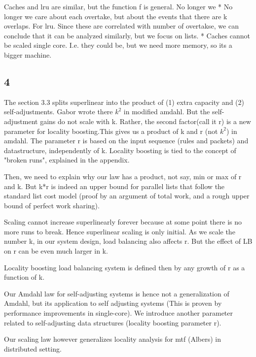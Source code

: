 Caches and lru are similar, but the function f is general. No longer we
* No longer we care about each overtake, but about the events that there are k overlaps. For lru. Since these are correlated with number of overtakse, we can conclude that it can be analyzed similarly, but we focus on lists.
* Caches cannot be scaled single core. I.e. they could be, but we need more memory, so its a bigger machine.

\subsection{4}



The section 3.3 splits superlinear into the product  of (1) extra  capacity and (2) self-adjustments. Gabor wrote there $k^2$ in modified amdahl. But the self-adjustment gains do not scale with k. Rather, the second factor(call it r) is a new parameter for locality boosting.This gives us a product of k and r (not $k^2$) in amdahl. The parameter  r is based on the input sequence (rules and packets) and datastructure, independently of k. Locality boosting is tied to the concept of "broken runs", explained in the appendix.

Then, we need to explain why our law has a product, not say, min or max of r and k. But k*r is indeed an upper bound for parallel lists that follow the standard list cost model  (proof by an argument of total work, and a rough upper bound of perfect work sharing).

Scaling cannot increase superlinearly forever because at some point there is no more runs to break. Hence superlinear scaling is only initial. As we scale the number k, in our system design, load balancing also affects r. But the effect of LB on r can be even much larger in k.

Locality boosting load balancing system is defined then by any growth of r as a function of k.



Our Amdahl law for self-adjusting systems is hence not a generalization of Amdahl, but its application to self adjusting systems (This is proven by performance improvements in single-core). We introduce another parameter related to self-adjusting  data structures (locality boosting parameter r).










Our scaling law however generalizes locality analysis for mtf (Albers) in distributed setting.


